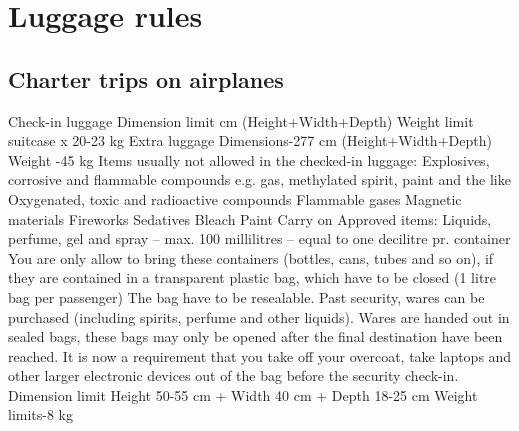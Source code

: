 \section{Luggage rules}

\subsection{Charter trips on airplanes}

Check-in luggage
\newline
Dimension limit\indent\indent{} cm (Height+Width+Depth)
\newline
Weight limit\indent\indent\indent{} suitcase x 20-23 kg
\newline\newline
Extra luggage
\newline
Dimensions\indent\indent\indent{}-277 cm (Height+Width+Depth)
\newline
Weight \indent\indent\indent \indent{}-45 kg
\newline\newline
Items usually not allowed in the checked-in luggage:
\newline
Explosives, corrosive and flammable compounds e.g. gas, methylated spirit, paint and the like  
\newline
Oxygenated, toxic and radioactive compounds 
\newline
Flammable gases 
\newline
Magnetic materials 
\newline
Fireworks 
\newline
Sedatives 
\newline
Bleach 
\newline
Paint
\newline\newline
Carry on
Approved items: Liquids, perfume, gel and spray – max. 100 millilitres – equal to one decilitre pr. container
You are only allow to bring these containers (bottles, cans, tubes and so on), if they are contained in a transparent plastic bag, which have to be closed (1 litre bag per passenger)
The bag have to be resealable.
\newline
Past security, wares can be purchased (including spirits, perfume and other liquids). Wares are handed out in sealed bags, these bags may only be opened after the final destination have been reached.
\newline
It is now a requirement that you take off your overcoat, take laptops and other larger electronic devices out of the bag before the security check-in.
\newline\newline
Dimension limit \indent\indent\indent	Height 50-55 cm + Width 40 cm + Depth 18-25 cm
\newline
Weight limits\indent\indent\indent{}-8 kg

